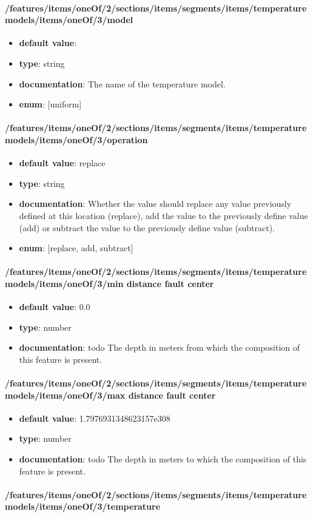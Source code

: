\paragraph{/features/items/oneOf/2/sections/items/segments/items/temperature models/items/oneOf/3/model}
\begin{itemize}\item {\bf default value}: 
\item {\bf type}: string
\item {\bf documentation}: The name of the temperature model.
\item {\bf enum}: [uniform]\end{itemize}\paragraph{/features/items/oneOf/2/sections/items/segments/items/temperature models/items/oneOf/3/operation}
\begin{itemize}\item {\bf default value}: replace
\item {\bf type}: string
\item {\bf documentation}: Whether the value should replace any value previously defined at this location (replace), add the value to the previously define value (add) or subtract the value to the previously define value (subtract).
\item {\bf enum}: [replace, add, subtract]\end{itemize}\paragraph{/features/items/oneOf/2/sections/items/segments/items/temperature models/items/oneOf/3/min distance fault center}
\begin{itemize}\item {\bf default value}: 0.0
\item {\bf type}: number
\item {\bf documentation}: todo The depth in meters from which the composition of this feature is present.
\end{itemize}\paragraph{/features/items/oneOf/2/sections/items/segments/items/temperature models/items/oneOf/3/max distance fault center}
\begin{itemize}\item {\bf default value}: 1.7976931348623157e308
\item {\bf type}: number
\item {\bf documentation}: todo The depth in meters to which the composition of this feature is present.
\end{itemize}\paragraph{/features/items/oneOf/2/sections/items/segments/items/temperature models/items/oneOf/3/temperature}
